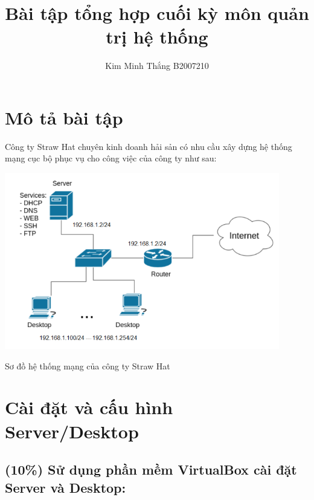 \documentclass[a4paper, 11pt]{article}
\title{Bài tập tổng hợp cuối kỳ môn quản trị hệ thống}
\author{Kim Minh Thắng B2007210}
\begin{document}
\maketitle
\tableofcontents
\listoffigures
\listoftables

\section*{Mô tả bài tập}

Công ty Straw Hat chuyên kinh doanh hải sản có nhu cầu xây dựng hệ thống mạng cục bộ phục vụ cho công việc của công ty như sau:

\begin{minipage}{\linewidth}
    \captionsetup{type=figure}
    \includegraphics[width=12cm]{images/networks.png}
    \caption{Sơ đồ hệ thống mạng của công ty Straw Hat}
\end{minipage}

\section{Cài đặt và cấu hình Server/Desktop}

\subsection{(10\%) Sử dụng phần mềm VirtualBox cài đặt Server và Desktop:}
\end{document}
